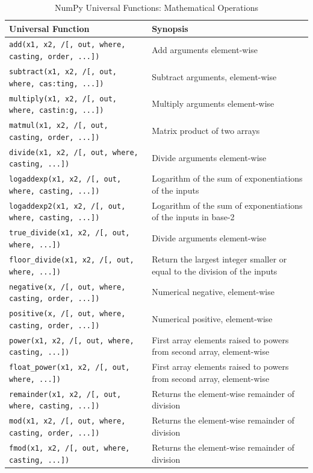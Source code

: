 \documentclass[a4paper,11pt]{book}
\begin{document}
\begin{appendices}
\begin{table}
\caption{NumPy Universal Functions: Mathematical Operations}
\label{tab:numpy_math_ufuncs}
\centering
\begin{tabular}{lp{13cm}}
\toprule \toprule 
Universal Function & Synopsis \\
\midrule
\texttt{add(x1, x2, /[, out, where, casting, order, ...])}& Add arguments element-wise}\\
\texttt{subtract(x1, x2, /[, out, where, cas:ting, ...])}& Subtract arguments, element-wise}\\
\texttt{multiply(x1, x2, /[, out, where, castin:g, ...])}& Multiply arguments element-wise}\\
\texttt{matmul(x1, x2, /[, out, casting, order, ...])}& Matrix product of two arrays}\\
\texttt{divide(x1, x2, /[, out, where, casting, ...])}& Divide arguments element-wise}\\
\texttt{logaddexp(x1, x2, /[, out, where, casting, ...])}& Logarithm of the sum of exponentiations of the inputs}\\
\texttt{logaddexp2(x1, x2, /[, out, where, casting, ...])}& Logarithm of the sum of exponentiations of the inputs in base-2}\\
\texttt{true\_divide(x1, x2, /[, out, where, ...])}& Divide arguments element-wise}\\
\texttt{floor\_divide(x1, x2, /[, out, where, ...])}& Return the largest integer smaller or equal to the division of the inputs}\\
\texttt{negative(x, /[, out, where, casting, order, ...])}& Numerical negative, element-wise}\\
\texttt{positive(x, /[, out, where, casting, order, ...])}& Numerical positive, element-wise}\\
\texttt{power(x1, x2, /[, out, where, casting, ...])}& First array elements raised to powers from second array, element-wise}\\
\texttt{float\_power(x1, x2, /[, out, where, ...])}& First array elements raised to powers from second array, element-wise}\\
\texttt{remainder(x1, x2, /[, out, where, casting, ...])}& Returns the element-wise remainder of division}\\
\texttt{mod(x1, x2, /[, out, where, casting, order, ...])}& Returns the element-wise remainder of division}\\
\texttt{fmod(x1, x2, /[, out, where, casting, ...])}& Returns the element-wise remainder of division}\\

\end{tabular}
\end{table}
\end{appendices}
\end{document}
